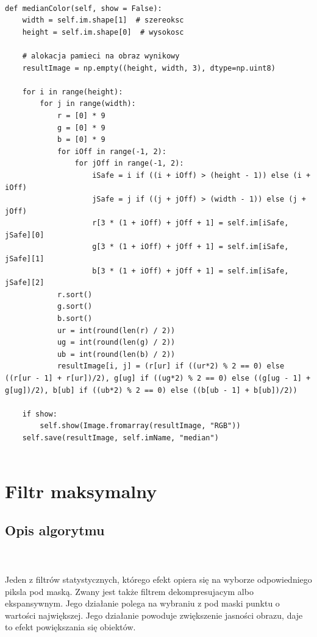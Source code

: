 \documentclass[final,a4paper,openany,12pt]{mwbk}
\begin{document}
\newpage


\begin{lstlisting}[caption=Filtr medianowy (obraz brawny)]
	
def medianColor(self, show = False):
	width = self.im.shape[1]  # szereoksc
	height = self.im.shape[0]  # wysokosc
	
	# alokacja pamieci na obraz wynikowy
	resultImage = np.empty((height, width, 3), dtype=np.uint8)
	
	for i in range(height):
		for j in range(width):
			r = [0] * 9
			g = [0] * 9
			b = [0] * 9
			for iOff in range(-1, 2):
				for jOff in range(-1, 2):
					iSafe = i if ((i + iOff) > (height - 1)) else (i + iOff)
					jSafe = j if ((j + jOff) > (width - 1)) else (j + jOff)
					r[3 * (1 + iOff) + jOff + 1] = self.im[iSafe, jSafe][0]
					g[3 * (1 + iOff) + jOff + 1] = self.im[iSafe, jSafe][1]
					b[3 * (1 + iOff) + jOff + 1] = self.im[iSafe, jSafe][2]
			r.sort()
			g.sort()
			b.sort()
			ur = int(round(len(r) / 2))
			ug = int(round(len(g) / 2))
			ub = int(round(len(b) / 2))
			resultImage[i, j] = (r[ur] if ((ur*2) % 2 == 0) else ((r[ur - 1] + r[ur])/2), g[ug] if ((ug*2) % 2 == 0) else ((g[ug - 1] + g[ug])/2), b[ub] if ((ub*2) % 2 == 0) else ((b[ub - 1] + b[ub])/2))
	
	if show:
		self.show(Image.fromarray(resultImage, "RGB"))
	self.save(resultImage, self.imName, "median")
	
\end{lstlisting}

\newpage
\section{Filtr maksymalny}
\subsection*{Opis algorytmu}
\hfill
\\\\
\indent  Jeden z filtrów statystycznych, którego efekt opiera się na wyborze odpowiedniego piksla pod maską. Zwany jest także filtrem dekompresujacym albo ekspansywnym. Jego działanie polega na wybraniu z pod maski punktu o wartości największej. Jego działanie powoduje zwiększenie jasności obrazu, daje to efekt powiększania się obiektów.
\end{document}
